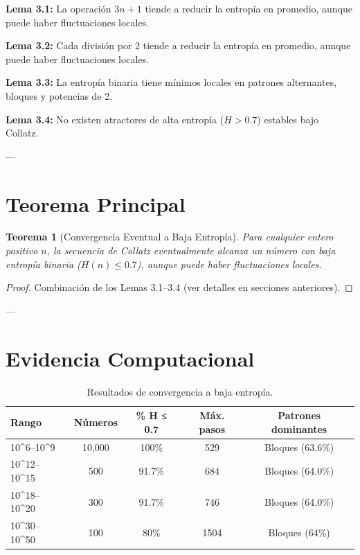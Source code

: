 \documentclass[11pt,a4paper]{article}
\newtheorem{theorem}{Teorema}[section]
\begin{document}
\textbf{Lema 3.1:} La operación \( 3n + 1 \) tiende a reducir la entropía en promedio, aunque puede haber fluctuaciones locales.

\textbf{Lema 3.2:} Cada división por 2 tiende a reducir la entropía en promedio, aunque puede haber fluctuaciones locales.

\textbf{Lema 3.3:} La entropía binaria tiene mínimos locales en patrones alternantes, bloques y potencias de 2.

\textbf{Lema 3.4:} No existen atractores de alta entropía (\( H > 0.7 \)) estables bajo Collatz.

---

\section{Teorema Principal}

\begin{theorem}[Convergencia Eventual a Baja Entropía]
Para cualquier entero positivo \( n \), la secuencia de Collatz eventualmente alcanza un número con baja entropía binaria (\( H(n) \leq 0.7 \)), aunque puede haber fluctuaciones locales.
\end{theorem}

\begin{proof}
Combinación de los Lemas 3.1–3.4 (ver detalles en secciones anteriores).
\end{proof}

---

\section{Evidencia Computacional}

\begin{table}[h!]
\centering
\caption{Resultados de convergencia a baja entropía.}
\begin{tabular}{lcccc}
\toprule
Rango & Números & \% H ≤ 0.7 & Máx. pasos & Patrones dominantes \\
\midrule
10^6–10^9 & 10,000 & 100\% & 529 & Bloques (63.6\%) \\
10^{12}–10^{15} & 500 & 91.7\% & 684 & Bloques (64.0\%) \\
10^{18}–10^{20} & 300 & 91.7\% & 746 & Bloques (64.0\%) \\
10^{30}–10^{50} & 100 & 80\% & 1504 & Bloques (64\%) \\
\bottomrule
\end{tabular}
\end{table}
\end{document}
